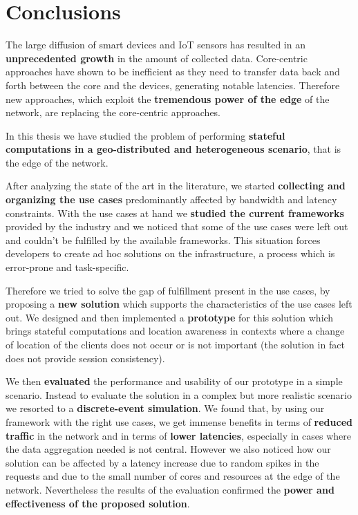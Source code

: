 \section{Conclusions}
\label{sec:conclusions}

The large diffusion of smart devices and IoT sensors has resulted in an \textbf{unprecedented growth} in the amount of collected data. Core-centric approaches have shown to be inefficient as they need to transfer data back and forth between the core and the devices, generating notable latencies. Therefore new approaches, which exploit the \textbf{tremendous power of the edge} of the network, are replacing the core-centric approaches.

In this thesis we have studied the problem of performing \textbf{stateful computations in a geo-distributed and heterogeneous scenario}, that is the edge of the network.

After analyzing the state of the art in the literature, we started \textbf{collecting and organizing the use cases} predominantly affected by bandwidth and latency constraints. With the use cases at hand we \textbf{studied the current frameworks} provided by the industry and we noticed that some of the use cases were left out and couldn't be fulfilled by the available frameworks. This situation forces developers to create ad hoc solutions on the infrastructure, a process which is error-prone and task-specific.

Therefore we tried to solve the gap of fulfillment present in the use cases, by proposing a \textbf{new solution} which supports the characteristics of the use cases left out. We designed and then implemented a \textbf{prototype} for this solution which brings stateful computations and location awareness in contexts where a change of location of the clients does not occur or is not important (the solution in fact does not provide session consistency).

We then \textbf{evaluated} the performance and usability of our prototype in a simple scenario. Instead to evaluate the solution in a complex but more realistic scenario we resorted to a \textbf{discrete-event simulation}.
We found that, by using our framework with the right use cases, we get immense benefits in terms of \textbf{reduced traffic} in the network and in terms of \textbf{lower latencies}, especially in cases where the data aggregation needed is not central. However we also noticed how our solution can be affected by a latency increase due to random spikes in the requests and due to the small number of cores and resources at the edge of the network. Nevertheless the results of the evaluation confirmed the \textbf{power and effectiveness of the proposed solution}.
